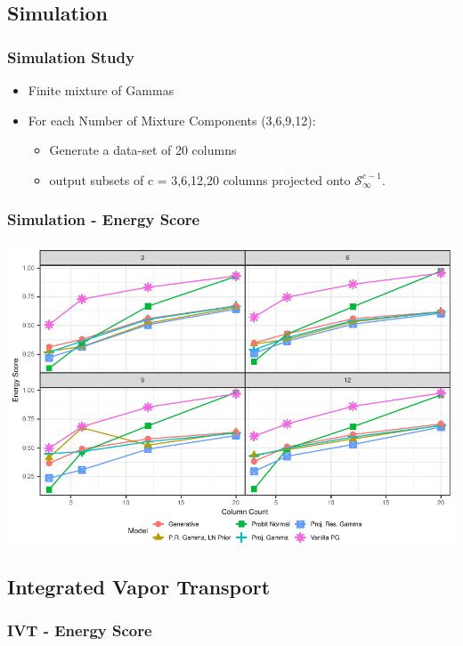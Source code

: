 \documentclass[aspectratio=169]{beamer}
\newlength{\frametextheight}
\begin{document}
\subsection{Simulation}

\begin{frame}
  \frametitle{Simulation Study}
  \begin{itemize}
    \item Finite mixture of Gammas
    \item For each Number of Mixture Components (3,6,9,12):
      \begin{itemize}
        \item Generate a data-set of 20 columns
        \item output subsets of c = 3,6,12,20 columns projected onto $\mathcal{S}_{\infty}^{c-1}$.
      \end{itemize}
  \end{itemize}
\end{frame}

\begin{frame}
  \frametitle{Simulation - Energy Score}
  \begin{center}
    \includegraphics[height=\frametextheight]{./images/simulation_es}
  \end{center}
\end{frame}


\subsection{Integrated Vapor Transport}

\begin{frame}
  \frametitle{IVT - Energy Score}
  \begin{center}
    
  \end{center}
\end{frame}
\end{document}
